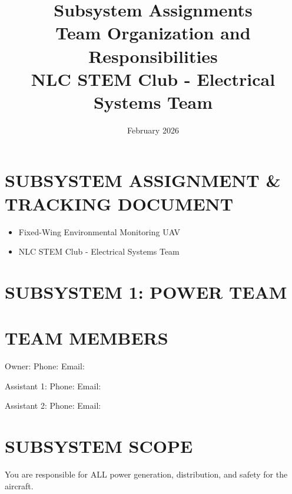 \documentclass[11pt,letterpaper]{article}
\title{\Huge\textbf{Subsystem Assignments}\\
\Large Team Organization and Responsibilities\\
\large NLC STEM Club - Electrical Systems Team}
\author{February 2026}
\date{}
\begin{document}
\maketitle
\thispagestyle{empty}
\newpage
\section{SUBSYSTEM ASSIGNMENT \& TRACKING DOCUMENT}

\begin{itemize}
  \item Fixed-Wing Environmental Monitoring UAV
  \item NLC STEM Club - Electrical Systems Team
\end{itemize}

\section{SUBSYSTEM 1: POWER TEAM}

\section{TEAM MEMBERS}

Owner:         \underline{\hspace{4.8cm}}  Phone: \underline{\hspace{1.7999999999999998cm}}  Email: \underline{\hspace{1.95cm}}\par

Assistant 1:   \underline{\hspace{4.8cm}}  Phone: \underline{\hspace{1.7999999999999998cm}}  Email: \underline{\hspace{1.95cm}}\par

Assistant 2:   \underline{\hspace{4.8cm}}  Phone: \underline{\hspace{1.7999999999999998cm}}  Email: \underline{\hspace{1.95cm}}\par

\section{SUBSYSTEM SCOPE}

You are responsible for ALL power generation, distribution, and safety for the aircraft.\par
\end{document}
